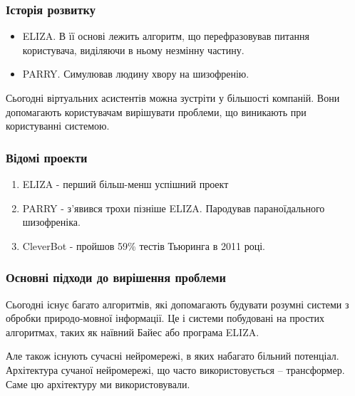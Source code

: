 \documentclass{beamer}
\begin{document}
\begin{frame}
    \frametitle{Історія розвитку}
    \begin{itemize}
        \item ELIZA.
        В її основі лежить алгоритм, що перефразовував питання користувача, виділяючи в ньому незмінну частину.

        \item PARRY.
        Симулював людину хвору на шизофренію.
    \end{itemize}

    Сьогодні віртуальних асистентів можна зустріти у більшості компаній. Вони допомагають користувачам вирішувати проблеми, що виникають при користуванні системою.
\end{frame}

\begin{frame}
    \frametitle{Відомі проекти}
    \begin{enumerate}
        \item ELIZA - перший більш-менш успішний проект
        \item PARRY - з'явився трохи пізніше ELIZA. Пародував параноїдального шизофреніка.
        \item CleverBot - пройшов 59\% тестів Тьюринга в 2011 році.
    \end{enumerate}
\end{frame}


\begin{frame}
    \frametitle{Основні підходи до вирішення проблеми}
    Сьогодні існує багато алгоритмів, які допомагають будувати розумні системи з обробки природо-мовної інформації. Це і системи побудовані на простих алгоритмах, таких як наївний Байес або програма ELIZA.
    
    Але також існують сучасні нейромережі, в яких набагато більний потенціал. Архітектура сучаної нейромережі, що часто використовується -- трансформер. Саме цю архітектуру ми використовували.
\end{frame}
\end{document}
